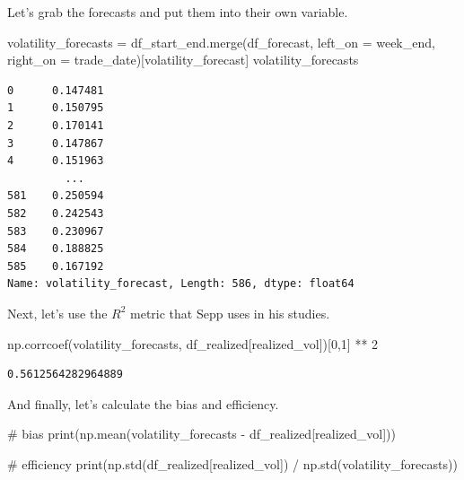 \documentclass[
  letterpaper,
  DIV=11,
  numbers=noendperiod]{scrreprt}
\newenvironment{Shaded}{\begin{snugshade}}{\end{snugshade}}
\newcommand{\BuiltInTok}[1]{\textcolor[rgb]{0.00,0.23,0.31}{#1}}
\newcommand{\CommentTok}[1]{\textcolor[rgb]{0.37,0.37,0.37}{#1}}
\newcommand{\DecValTok}[1]{\textcolor[rgb]{0.68,0.00,0.00}{#1}}
\newcommand{\NormalTok}[1]{\textcolor[rgb]{0.00,0.23,0.31}{#1}}
\newcommand{\OperatorTok}[1]{\textcolor[rgb]{0.37,0.37,0.37}{#1}}
\newcommand{\StringTok}[1]{\textcolor[rgb]{0.13,0.47,0.30}{#1}}
\begin{document}
Let's grab the forecasts and put them into their own variable.

\begin{Shaded}
\begin{Highlighting}[]
\NormalTok{volatility\_forecasts }\OperatorTok{=}\NormalTok{ df\_start\_end.merge(df\_forecast, left\_on }\OperatorTok{=} \StringTok{\textquotesingle{}week\_end\textquotesingle{}}\NormalTok{, right\_on }\OperatorTok{=} \StringTok{\textquotesingle{}trade\_date\textquotesingle{}}\NormalTok{)[}\StringTok{\textquotesingle{}volatility\_forecast\textquotesingle{}}\NormalTok{]}
\NormalTok{volatility\_forecasts}
\end{Highlighting}
\end{Shaded}

\begin{verbatim}
0      0.147481
1      0.150795
2      0.170141
3      0.147867
4      0.151963
         ...   
581    0.250594
582    0.242543
583    0.230967
584    0.188825
585    0.167192
Name: volatility_forecast, Length: 586, dtype: float64
\end{verbatim}

Next, let's use the \(R^2\) metric that Sepp uses in his studies.

\begin{Shaded}
\begin{Highlighting}[]
\NormalTok{np.corrcoef(volatility\_forecasts, df\_realized[}\StringTok{\textquotesingle{}realized\_vol\textquotesingle{}}\NormalTok{])[}\DecValTok{0}\NormalTok{,}\DecValTok{1}\NormalTok{] }\OperatorTok{**} \DecValTok{2}
\end{Highlighting}
\end{Shaded}

\begin{verbatim}
0.5612564282964889
\end{verbatim}

And finally, let's calculate the bias and efficiency.

\begin{Shaded}
\begin{Highlighting}[]
\CommentTok{\# bias}
\BuiltInTok{print}\NormalTok{(np.mean(volatility\_forecasts }\OperatorTok{{-}}\NormalTok{ df\_realized[}\StringTok{\textquotesingle{}realized\_vol\textquotesingle{}}\NormalTok{]))}

\CommentTok{\# efficiency}
\BuiltInTok{print}\NormalTok{(np.std(df\_realized[}\StringTok{\textquotesingle{}realized\_vol\textquotesingle{}}\NormalTok{]) }\OperatorTok{/}\NormalTok{ np.std(volatility\_forecasts))}
\end{Highlighting}
\end{Shaded}
\end{document}
